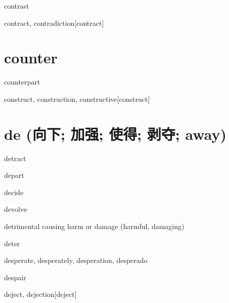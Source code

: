 \begin{RefWord}{contrast}
\end{RefWord}

\begin{DefWord}{contract, contradiction}[contract]
\end{DefWord}

\section{counter}

\begin{RefWord}{counterpart}
\end{RefWord}

\begin{RefWord}{construct, construction, constructive}[construct]
\end{RefWord}



\section{de (向下; 加强; 使得; 剥夺; away)}

\begin{RefWord}{detract}
\end{RefWord}

\begin{RefWord}{depart}
\end{RefWord}

\begin{RefWord}{decide}
\end{RefWord}

\begin{RefWord}{devolve}
\end{RefWord}

\begin{RefWord}{detrimental}
    causing harm or damage (harmful, damaging)
\end{RefWord}

\begin{RefWord}{deter}
\end{RefWord}

\begin{RefWord}{desperate, desperately, desperation, desperado}
\end{RefWord}

\begin{RefWord}{despair}
\end{RefWord}

\begin{RefWord}{deject, dejection}[deject]
\end{RefWord}

